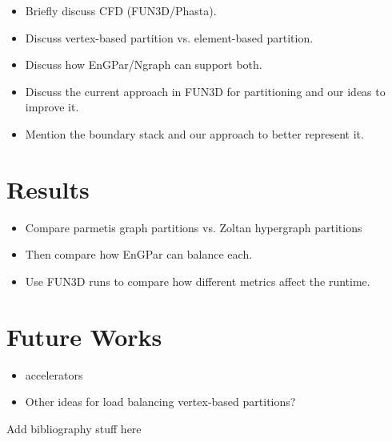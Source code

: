 \documentclass[conference]{IEEEtran}
\begin{document}
\begin{itemize}
\item Briefly discuss CFD (FUN3D/Phasta).
\item Discuss vertex-based partition vs. element-based partition.
\item Discuss how EnGPar/Ngraph can support both.
\item Discuss the current approach in FUN3D for partitioning and our ideas to improve it.
\item Mention the boundary stack and our approach to better represent it.
\end{itemize}

\section{Results}

\begin{itemize}
\item Compare parmetis graph partitions vs. Zoltan hypergraph partitions
\item Then compare how EnGPar can balance each.
\item Use FUN3D runs to compare how different metrics affect the runtime.
\end{itemize}


\section{Future Works}

\begin{itemize}
\item accelerators
\item Other ideas for load balancing vertex-based partitions?
\end{itemize}

{\color{red} Add bibliography stuff here}
\end{document}
